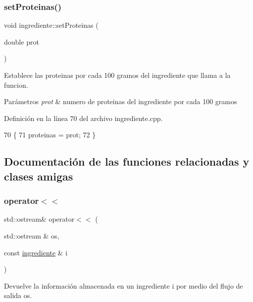 \subsubsection{\texorpdfstring{set\+Proteinas()}{setProteinas()}}
{\footnotesize\ttfamily void ingrediente\+::set\+Proteinas (\begin{DoxyParamCaption}\item[{double}]{prot }\end{DoxyParamCaption})}



Establece las proteinas por cada 100 gramos del ingrediente que llama a la funcion. 


\begin{DoxyParams}{Parámetros}
{\em prot} & numero de proteinas del ingrediente por cada 100 gramos \\
\hline
\end{DoxyParams}


Definición en la línea 70 del archivo ingrediente.\+cpp.


\begin{DoxyCode}
70                                          \{
71     proteinas = prot;
72 \}
\end{DoxyCode}


\subsection{Documentación de las funciones relacionadas y clases amigas}
\mbox{\label{classingrediente_a5049e635051bc3b2ff1c215fc4e2638a}} 
\subsubsection{\texorpdfstring{operator$<$$<$}{operator<<}}
{\footnotesize\ttfamily std\+::ostream\& operator$<$$<$ (\begin{DoxyParamCaption}\item[{std\+::ostream \&}]{os,  }\item[{const \hyperlink{classingrediente}{ingrediente} \&}]{i }\end{DoxyParamCaption})\hspace{0.3cm}{\ttfamily [friend]}}



Devuelve la información almacenada en un ingrediente i por medio del flujo de salida os. 


